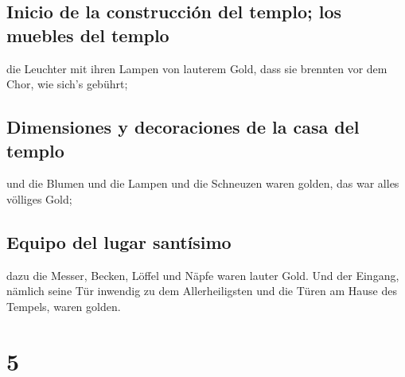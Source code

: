 \hypertarget{inicio-de-la-construcciuxf3n-del-templo-los-muebles-del-templo}{%
\subsection{Inicio de la construcción del templo; los muebles del
templo}\label{inicio-de-la-construcciuxf3n-del-templo-los-muebles-del-templo}}

 die Leuchter mit ihren Lampen von lauterem Gold, dass
sie brennten vor dem Chor, wie sich's gebührt;

\hypertarget{dimensiones-y-decoraciones-de-la-casa-del-templo}{%
\subsection{Dimensiones y decoraciones de la casa del
templo}\label{dimensiones-y-decoraciones-de-la-casa-del-templo}}

 und die Blumen und die Lampen und die Schneuzen waren
golden, das war alles völliges Gold;

\hypertarget{equipo-del-lugar-santuxedsimo}{%
\subsection{Equipo del lugar
santísimo}\label{equipo-del-lugar-santuxedsimo}}

 dazu die Messer, Becken, Löffel und Näpfe waren lauter
Gold. Und der Eingang, nämlich seine Tür inwendig zu dem Allerheiligsten
und die Türen am Hause des Tempels, waren golden.

\hypertarget{section-4}{%
\section{5}\label{section-4}}

